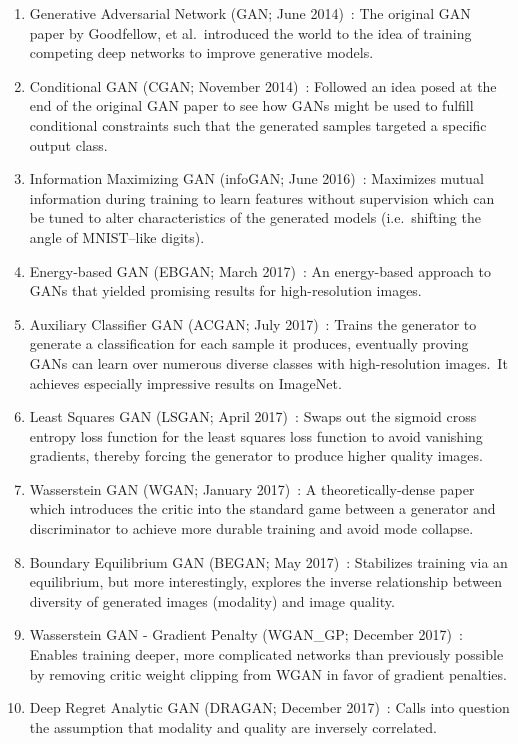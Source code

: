 \documentclass[conference]{IEEEtran}
\begin{document}
    \begin{enumerate}
        \item Generative Adversarial Network (GAN; June 2014)~\cite{goodfellow2014generative}: The original GAN paper by Goodfellow, et al.\ introduced the world to the idea of training competing deep networks to improve generative models.
        \item Conditional GAN (CGAN; November 2014)~\cite{mirza2014conditional}: Followed an idea posed at the end of the original GAN paper to see how GANs might be used to fulfill conditional constraints such that the generated samples targeted a specific output class.
        \item Information Maximizing GAN (infoGAN; June 2016)~\cite{chen2016infogan}: Maximizes mutual information during training to learn features without supervision which can be tuned to alter characteristics of the generated models (i.e.\ shifting the angle of MNIST--like digits).
        \item Energy-based GAN (EBGAN; March 2017)~\cite{zhao2017energybased}: An energy-based approach to GANs that yielded promising results for high-resolution images.
        \item Auxiliary Classifier GAN (ACGAN; July 2017)~\cite{odena2017conditional}: Trains the generator to generate a classification for each sample it produces, eventually proving GANs can learn over numerous diverse classes with high-resolution images.\ It achieves especially impressive results on ImageNet.
        \item Least Squares GAN (LSGAN; April 2017)~\cite{mao2017squares}: Swaps out the sigmoid cross entropy loss function for the least squares loss function to avoid vanishing gradients, thereby forcing the generator to produce higher quality images.
        \item Wasserstein GAN (WGAN; January 2017)~\cite{arjovsky2017wasserstein}: A theoretically-dense paper which introduces the critic into the standard game between a generator and discriminator to achieve more durable training and avoid mode collapse.
        \item Boundary Equilibrium GAN (BEGAN; May 2017)~\cite{berthelot2017began}: Stabilizes training via an equilibrium, but more interestingly, explores the inverse relationship between diversity of generated images (modality) and image quality.
        \item Wasserstein GAN - Gradient Penalty (WGAN\_GP; December 2017)~\cite{gulrajani2017improved}: Enables training deeper, more complicated networks than previously possible by removing critic weight clipping from WGAN in favor of gradient penalties.
        \item Deep Regret Analytic GAN (DRAGAN; December 2017)~\cite{kodali2017convergence}: Calls into question the assumption that modality and quality are inversely correlated.
    \end{enumerate}
\end{document}
